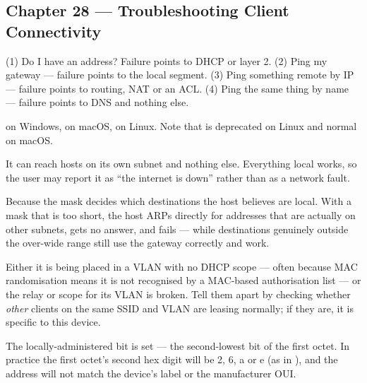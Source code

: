 \subsection*{Chapter 28 --- Troubleshooting Client Connectivity}
\begin{tightnum}
  \item (1) Do I have an address? Failure points to DHCP or layer 2. (2) Ping my
        gateway --- failure points to the local segment. (3) Ping something remote
        by IP --- failure points to routing, NAT or an ACL. (4) Ping the same thing
        by name --- failure points to DNS and nothing else.
  \item {} on Windows,  on macOS,  on
        Linux. Note that  is deprecated on Linux and normal on
        macOS.
  \item It can reach hosts on its own subnet and nothing else. Everything local
        works, so the user may report it as ``the internet is down'' rather than
        as a network fault.
  \item Because the mask decides which destinations the host believes are local.
        With a mask that is too short, the host ARPs directly for addresses that
        are actually on other subnets, gets no answer, and fails --- while
        destinations genuinely outside the over-wide range still use the gateway
        correctly and work.
  \item Either it is being placed in a VLAN with no DHCP scope --- often because
        MAC randomisation means it is not recognised by a MAC-based authorisation
        list --- or the relay or scope for its VLAN is broken. Tell them apart by
        checking whether \emph{other} clients on the same SSID and VLAN are
        leasing normally; if they are, it is specific to this device.
  \item The locally-administered bit is set --- the second-lowest bit of the first
        octet. In practice the first octet's second hex digit will be 2, 6, a or e
        (as in ), and the address will not match the device's label or
        the manufacturer OUI.
\end{tightnum}

